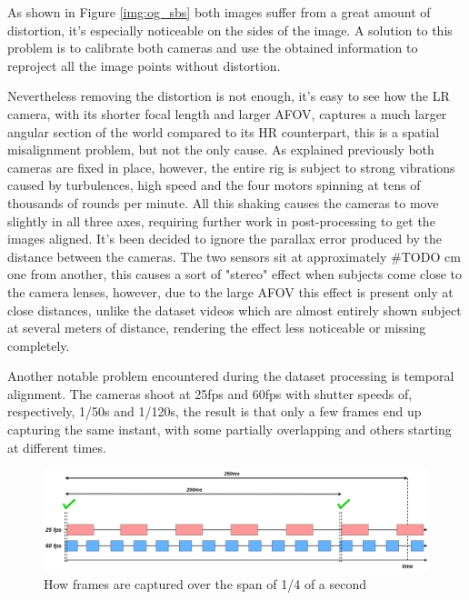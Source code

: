 As shown in Figure \ref{img:og_sbs} both images suffer from a great amount of distortion, it's especially noticeable on the sides of the image. A solution to this problem is to calibrate both cameras and use the obtained information to reproject all the image points without distortion.

Nevertheless removing the distortion is not enough, it's easy to see how the LR camera, with its shorter focal length and larger AFOV, captures a much larger angular section of the world compared to its HR counterpart, this is a spatial misalignment problem, but not the only cause. As explained previously both cameras are fixed in place, however, the entire rig is subject to strong vibrations caused by turbulences, high speed and the four motors spinning at tens of thousands of rounds per minute. All this shaking causes the cameras to move slightly in all three axes, requiring further work in post-processing to get the images aligned.
It's been decided to ignore the parallax error produced by the distance between the cameras. The two sensors sit at approximately \#TODO cm one from another, this causes a sort of "stereo" effect when subjects come close to the camera lenses, however, due to the large AFOV this effect is present only at close distances, unlike the dataset videos which are almost entirely shown subject at several meters of distance, rendering the effect less noticeable or missing completely.\newline

Another notable problem encountered during the dataset processing is temporal alignment. The cameras shoot at 25fps and 60fps with shutter speeds of, respectively, 1/50s and 1/120s, the result is that only a few frames end up capturing the same instant, with some partially overlapping and others starting at different times.

\begin{figure}[h]
  \centering
  \includegraphics[scale=0.22]{figures/temporal_align_3.png}
  \caption{How frames are captured over the span of 1/4 of a second}
  \label{img:temp_align}
\end{figure}

